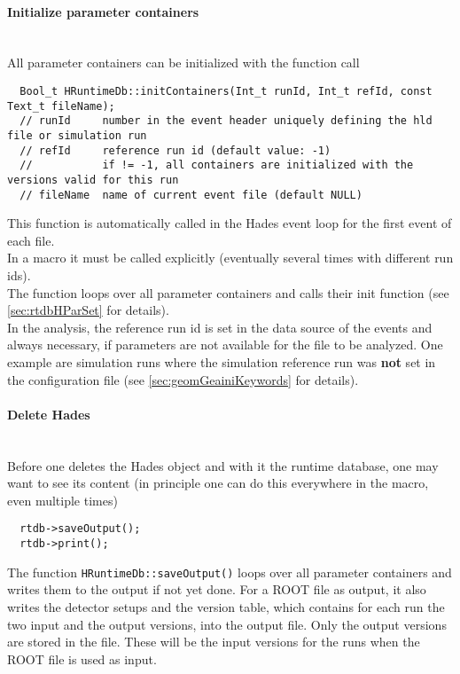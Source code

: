 \paragraph{Initialize parameter containers} ~\\
All parameter containers can be initialized with the function call
\begin{lstlisting}
  Bool_t HRuntimeDb::initContainers(Int_t runId, Int_t refId, const Text_t fileName);
  // runId     number in the event header uniquely defining the hld file or simulation run
  // refId     reference run id (default value: -1)
  //           if != -1, all containers are initialized with the versions valid for this run
  // fileName  name of current event file (default NULL)
\end{lstlisting}
This function is automatically called in the Hades event loop for the first event of each file.\\
In a macro it must be called explicitly (eventually several times with different run ids).\\
The function loops over all parameter containers and calls their init function (see \ref{sec:rtdbHParSet} for 
details).\\

In the analysis, the reference run id is set in the data source of the events and always necessary, if parameters are 
not available for the file to be analyzed. One example are simulation runs where the simulation reference run was 
\textbf{not} set in the configuration file (see \ref{sec:geomGeainiKeywords} for details).

\paragraph{Delete Hades} ~\\
Before one deletes the Hades object and with it the runtime database, one may want to see its content (in principle 
one can do this everywhere in the macro, even multiple times)
\begin{lstlisting}
  rtdb->saveOutput();
  rtdb->print();
\end{lstlisting}

The function \verb+HRuntimeDb::saveOutput()+ loops over all parameter containers and writes them to the output if 
not yet done. For a ROOT file as output, it also writes the detector setups and the version table, which contains 
for each run the two input and the output versions, into the output file. Only the output versions are stored in the file. 
These will be the input versions for the runs when the ROOT file is used as input.\\

